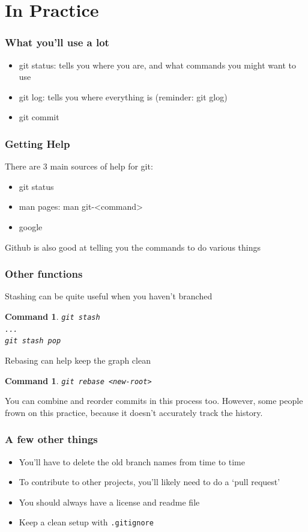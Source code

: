 \documentclass{beamer}
\newtheorem{command}[theorem]{Command}
\begin{document}
\section{In Practice}

\begin{frame}
    \frametitle{What you'll use a lot}
    \begin{itemize}
        \item git status: tells you where you are, and what commands you might want to use
        \item git log: tells you where everything is (reminder: git glog)
        \item git commit
    \end{itemize}
\end{frame}


\begin{frame}
    \frametitle{Getting Help}
    There are 3 main sources of help for git:
    \begin{itemize}
        \item git status
        \item man pages: man git-<command>
        \item google
    \end{itemize}
    Github is also good at telling you the commands to do various things
\end{frame}


\begin{frame}
    \frametitle{Other functions}
    Stashing can be quite useful when you haven't branched
    \begin{command}
        \texttt{git stash \\ ... \\ git stash pop}
    \end{command}

    \pause
    Rebasing can help keep the graph clean
    \begin{command}
        \texttt{git rebase <new-root>}
    \end{command}
    You can combine and reorder commits in this process too. However, some people frown on this practice, because it doesn't accurately track the history.
\end{frame}


\begin{frame}
    \frametitle{A few other things}
    \begin{itemize}
        \item You'll have to delete the old branch names from time to time
        \item To contribute to other projects, you'll likely need to do a `pull request'
        \item You should always have a license and readme file
        \item Keep a clean setup with \texttt{.gitignore}
    \end{itemize}
\end{frame}
\end{document}
